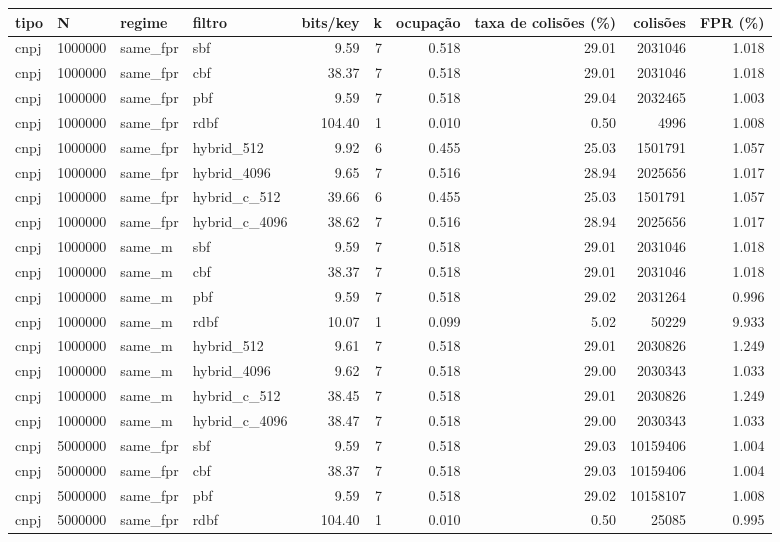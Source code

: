 \begin{tabular}{llllrrrrrr}
\toprule
tipo & N & regime & filtro & bits/key & k & ocupação & taxa de colisões (\%) & colisões & FPR (\%) \\
\midrule
cnpj & 1000000 & same\_fpr & sbf & 9.59 & 7 & 0.518 & 29.01 & 2031046 & 1.018 \\
cnpj & 1000000 & same\_fpr & cbf & 38.37 & 7 & 0.518 & 29.01 & 2031046 & 1.018 \\
cnpj & 1000000 & same\_fpr & pbf & 9.59 & 7 & 0.518 & 29.04 & 2032465 & 1.003 \\
cnpj & 1000000 & same\_fpr & rdbf & 104.40 & 1 & 0.010 & 0.50 & 4996 & 1.008 \\
cnpj & 1000000 & same\_fpr & hybrid\_512 & 9.92 & 6 & 0.455 & 25.03 & 1501791 & 1.057 \\
cnpj & 1000000 & same\_fpr & hybrid\_4096 & 9.65 & 7 & 0.516 & 28.94 & 2025656 & 1.017 \\
cnpj & 1000000 & same\_fpr & hybrid\_c\_512 & 39.66 & 6 & 0.455 & 25.03 & 1501791 & 1.057 \\
cnpj & 1000000 & same\_fpr & hybrid\_c\_4096 & 38.62 & 7 & 0.516 & 28.94 & 2025656 & 1.017 \\
cnpj & 1000000 & same\_m & sbf & 9.59 & 7 & 0.518 & 29.01 & 2031046 & 1.018 \\
cnpj & 1000000 & same\_m & cbf & 38.37 & 7 & 0.518 & 29.01 & 2031046 & 1.018 \\
cnpj & 1000000 & same\_m & pbf & 9.59 & 7 & 0.518 & 29.02 & 2031264 & 0.996 \\
cnpj & 1000000 & same\_m & rdbf & 10.07 & 1 & 0.099 & 5.02 & 50229 & 9.933 \\
cnpj & 1000000 & same\_m & hybrid\_512 & 9.61 & 7 & 0.518 & 29.01 & 2030826 & 1.249 \\
cnpj & 1000000 & same\_m & hybrid\_4096 & 9.62 & 7 & 0.518 & 29.00 & 2030343 & 1.033 \\
cnpj & 1000000 & same\_m & hybrid\_c\_512 & 38.45 & 7 & 0.518 & 29.01 & 2030826 & 1.249 \\
cnpj & 1000000 & same\_m & hybrid\_c\_4096 & 38.47 & 7 & 0.518 & 29.00 & 2030343 & 1.033 \\
cnpj & 5000000 & same\_fpr & sbf & 9.59 & 7 & 0.518 & 29.03 & 10159406 & 1.004 \\
cnpj & 5000000 & same\_fpr & cbf & 38.37 & 7 & 0.518 & 29.03 & 10159406 & 1.004 \\
cnpj & 5000000 & same\_fpr & pbf & 9.59 & 7 & 0.518 & 29.02 & 10158107 & 1.008 \\
cnpj & 5000000 & same\_fpr & rdbf & 104.40 & 1 & 0.010 & 0.50 & 25085 & 0.995 \\

\end{tabular}
